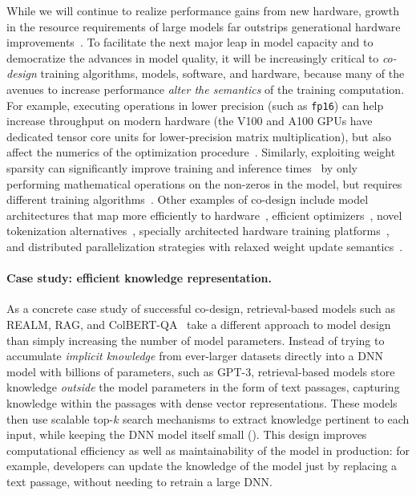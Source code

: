 While we will continue to realize performance gains from new hardware, growth in the resource requirements of large models far outstrips generational hardware improvements~\citep{brown2020gpt3}. To facilitate the next major leap in model capacity and to democratize the advances in model quality, it will be increasingly critical to \emph{co-design} training algorithms, models, software, and hardware, because many of the avenues to increase performance \emph{alter the semantics} of the training computation. For example, executing operations in lower precision (such as \texttt{fp16}) can help increase throughput on modern hardware (\eg the V100 and A100 GPUs have dedicated tensor core units for lower-precision matrix multiplication), but also affect the numerics of the optimization procedure~\citep{micikevicius2017mixed}. Similarly, exploiting weight sparsity can significantly improve training and inference times~\citep{Elsen_2020_CVPR, gale2020sparse} by only performing mathematical operations on the non-zeros in the model, but requires different training algorithms~\citep{jayakumar2021top, pmlr-v119-evci20a, dettmers2019sparse}. Other examples of co-design include model architectures that map more efficiently to hardware~\citep{pmlr-v97-so19a, child2019generating, wang2020linformer, lee2021fnet, kitaev2020reformer,longformer, tay2020efficient, ren2021combiner}, efficient optimizers~\citep{anil2020scalable, shazeer2018adafactor}, novel tokenization alternatives~\citep{xue2021byt5, tay2021charformer}, specially architected hardware training platforms~\cite{jouppi2017datacenter, mudigere2021high, selene}, and distributed parallelization strategies with relaxed weight update semantics~\citep{narayanan2019pipedream, narayanan2021memory}.

\paragraph{Case study: efficient knowledge representation.} As a concrete case study of successful co-design, retrieval-based models such as REALM, RAG, and ColBERT-QA~\cite{guu2020realm,lewis2020retrieval,Khattab-etal:2020:OpenQA} take a different approach to model design than simply increasing the number of model parameters. Instead of trying to accumulate \emph{implicit knowledge} from ever-larger datasets directly into a DNN model with billions of parameters, such as GPT-3, retrieval-based models store knowledge \emph{outside} the model parameters in the form of text passages, capturing knowledge within the passages with dense vector representations. These models then use scalable top-$k$ search mechanisms to extract knowledge pertinent to each input, while keeping the DNN model itself small (). This design improves computational efficiency as well as maintainability of the model in production: for example, developers can update the knowledge of the model just by replacing a text passage, without needing to retrain a large DNN.

